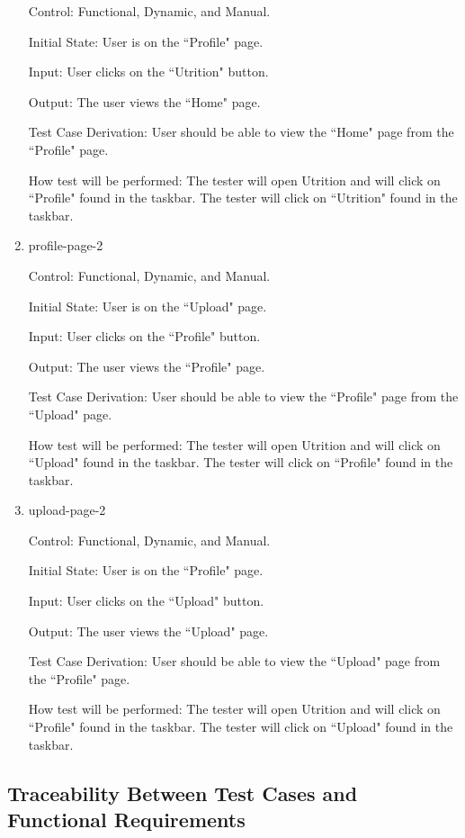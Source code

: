 \documentclass[12pt, titlepage]{article}
\begin{document}
\begin{enumerate}
		Control: Functional, Dynamic, and Manual.
		
		Initial State: User is on the ``Profile" page.
		
		Input: User clicks on the ``Utrition" button.
		
		Output: The user views the ``Home" page.
		
		Test Case Derivation: User should be able to view the ``Home" page from the ``Profile" page.
		
		How test will be performed: The tester will open Utrition and will click on ``Profile" found in the taskbar. The tester will click on ``Utrition" found in the taskbar.
		
		\item{profile-page-2\\}
		
		Control: Functional, Dynamic, and Manual.
		
		Initial State: User is on the ``Upload" page.
		
		Input: User clicks on the ``Profile" button.
		
		Output: The user views the ``Profile" page.
		
		Test Case Derivation: User should be able to view the ``Profile" page from the ``Upload" page.
		
		How test will be performed: The tester will open Utrition and will click on ``Upload" found in the taskbar. The tester will click on ``Profile" found in the taskbar.
		
		\item{upload-page-2\\}
		
		Control: Functional, Dynamic, and Manual.
		
		Initial State: User is on the ``Profile" page.
		
		Input: User clicks on the ``Upload" button.
		
		Output: The user views the ``Upload" page.
		
		Test Case Derivation: User should be able to view the ``Upload" page from the ``Profile" page.
		
		How test will be performed: The tester will open Utrition and will click on ``Profile" found in the taskbar. The tester will click on ``Upload" found in the taskbar.
		
	\end{enumerate}
	
	\subsection{Traceability Between Test Cases and Functional Requirements}
	
\end{document}
